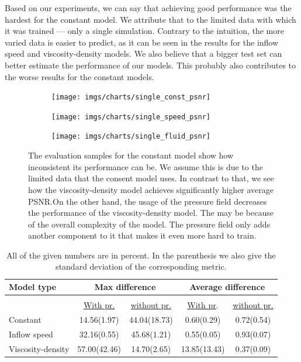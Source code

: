\documentclass{llncs}
\begin{document}
Based on our experiments, we can say that achieving good performance was the hardest for the constant model. We attribute that to the limited data with which it was trained --- only a single simulation. Contrary to the intuition, the more varied data is easier to predict, as it can be seen in the results for the inflow speed and viscosity-density models. We also believe that a bigger test set can better estimate the performance of our models. This probably also contributes to the worse results for the constant models.

\begin{figure}
  \begin{subfigure}{.3\textwidth}
    \centering
    \texttt{[image: imgs/charts/single\_const\_psnr]}
  \end{subfigure}
  \begin{subfigure}{.3\textwidth}
    \centering
    \texttt{[image: imgs/charts/single\_speed\_psnr]}
  \end{subfigure}
  \begin{subfigure}{.3\textwidth}
    \centering
    \texttt{[image: imgs/charts/single\_fluid\_psnr]}
  \end{subfigure}
  \caption{The evaluation samples for the constant model show how inconsistent its performance can be. We assume this is due to the limited data that the consent model uses. In contrast to that, we see how the viscosity-density model achieves significantly higher average PSNR.\@ On the other hand, the usage of the pressure field decreases the performance of the viscosity-density model. The may be because of the overall complexity of the model. The pressure field only adds another component to it that makes it even more hard to train.}\label{fig:single_psnr}
\end{figure}

\begin{table}
  \begin{center}
    \begin{tabular}{lcc|cc}
      \textbf{Model type} & \multicolumn{2}{c|}{\textbf{Max difference}}  &  \multicolumn{2}{c}{\textbf{Average difference}}\\
      \hline 
      \multicolumn{3}{c|}{}&&\\
                 & \underline{With pr.} & \underline{without pr.}  &  \underline{With pr}.& \underline{without pr.}\\
      
      Constant           &14.56(1.97)&44.04(18.73)&0.60(0.29)&0.72(0.54)  \\
      Inflow speed       &32.16(0.55)&45.68(1.21)&0.55(0.05)&0.93(0.07)   \\
      Viscosity-density  &57.00(42.46)&14.70(2.65)&13.85(13.43)&0.37(0.09)\\
    \end{tabular}
  \end{center}
  \caption{All of the given numbers are in percent. In the parenthesis we also give the standard deviation of the corresponding metric. }\label{tab:single}
\end{table}
\end{document}
